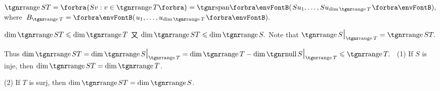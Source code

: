 \documentclass[a4paper, 11pt, UTF8]{article}
\begin{document}
\begin{large}
\par\quad
$\range ST=\Bra{Sv:v\in\range T}=\Span{Su_1,\dots,Su_{\dim\range T}},$ where \,$B_{\range T}=\Par{u_1,\dots,u_{\dim\range T}}.$\par\quad
$\dim\range ST\leqslant \dim\range T$
又 $\dim\range ST\leqslant \dim\range S.$\PfEnd\vspace{4pt}\quad
\Or Note that $\range S\mid_{\range T}=\range ST.$\par\quad
Thus $\dim\range ST=\dim\range S\mid_{\range T}=\dim\range T-\dim\null S\mid_{\range T}\leqslant \range T.$\vspace{4pt}\PfEnd
\Corollary \,\,\,(1) If $S$ is inje, then $\dim\range ST=\dim\range T$.\par\Blind{\Corollary \,\,}
(2) If $T$ is surj, then $\dim\range ST=\dim\range S$.
\SepLine


\end{large}
\end{document}
